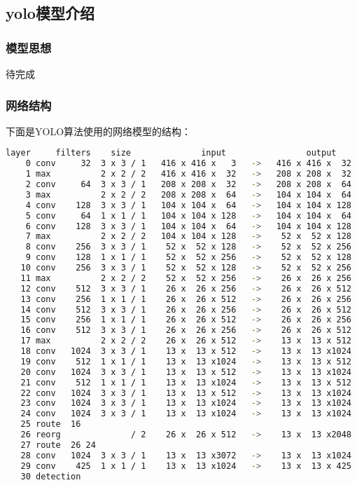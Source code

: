 \documentclass[openany]{ctexbook}
\begin{document}
\subsection{yolo模型介绍}
\subsubsection{模型思想}
待完成
\subsubsection{网络结构}
下面是YOLO算法使用的网络模型的结构：
{\setmainfont{Courier New Bold}                          %
\begin{lstlisting}[language=bash]
layer     filters    size              input                output
    0 conv     32  3 x 3 / 1   416 x 416 x   3   ->   416 x 416 x  32
    1 max          2 x 2 / 2   416 x 416 x  32   ->   208 x 208 x  32
    2 conv     64  3 x 3 / 1   208 x 208 x  32   ->   208 x 208 x  64
    3 max          2 x 2 / 2   208 x 208 x  64   ->   104 x 104 x  64
    4 conv    128  3 x 3 / 1   104 x 104 x  64   ->   104 x 104 x 128
    5 conv     64  1 x 1 / 1   104 x 104 x 128   ->   104 x 104 x  64
    6 conv    128  3 x 3 / 1   104 x 104 x  64   ->   104 x 104 x 128
    7 max          2 x 2 / 2   104 x 104 x 128   ->    52 x  52 x 128
    8 conv    256  3 x 3 / 1    52 x  52 x 128   ->    52 x  52 x 256
    9 conv    128  1 x 1 / 1    52 x  52 x 256   ->    52 x  52 x 128
   10 conv    256  3 x 3 / 1    52 x  52 x 128   ->    52 x  52 x 256
   11 max          2 x 2 / 2    52 x  52 x 256   ->    26 x  26 x 256
   12 conv    512  3 x 3 / 1    26 x  26 x 256   ->    26 x  26 x 512
   13 conv    256  1 x 1 / 1    26 x  26 x 512   ->    26 x  26 x 256
   14 conv    512  3 x 3 / 1    26 x  26 x 256   ->    26 x  26 x 512
   15 conv    256  1 x 1 / 1    26 x  26 x 512   ->    26 x  26 x 256
   16 conv    512  3 x 3 / 1    26 x  26 x 256   ->    26 x  26 x 512
   17 max          2 x 2 / 2    26 x  26 x 512   ->    13 x  13 x 512
   18 conv   1024  3 x 3 / 1    13 x  13 x 512   ->    13 x  13 x1024
   19 conv    512  1 x 1 / 1    13 x  13 x1024   ->    13 x  13 x 512
   20 conv   1024  3 x 3 / 1    13 x  13 x 512   ->    13 x  13 x1024
   21 conv    512  1 x 1 / 1    13 x  13 x1024   ->    13 x  13 x 512
   22 conv   1024  3 x 3 / 1    13 x  13 x 512   ->    13 x  13 x1024
   23 conv   1024  3 x 3 / 1    13 x  13 x1024   ->    13 x  13 x1024
   24 conv   1024  3 x 3 / 1    13 x  13 x1024   ->    13 x  13 x1024
   25 route  16
   26 reorg              / 2    26 x  26 x 512   ->    13 x  13 x2048
   27 route  26 24
   28 conv   1024  3 x 3 / 1    13 x  13 x3072   ->    13 x  13 x1024
   29 conv    425  1 x 1 / 1    13 x  13 x1024   ->    13 x  13 x 425
   30 detection
\end{lstlisting}}
\end{document}
